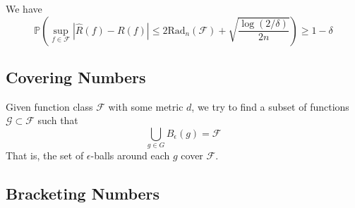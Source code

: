  \begin{theorem}
    \label{thm:uniform-deviation-bound-via-rademacher}
    We have 
    \begin{equation}
      \mathbb{P} \left( \sup_{f \in \mathcal{F}} |\hat{R} (f) - R(f)| \leq 2 \mathrm{Rad}_n (\mathcal{F}) + \sqrt{\frac{\log (2 / \delta)}{2 n}} \right) \geq 1 - \delta
    \end{equation}
  \end{theorem}

\subsection{Covering Numbers} 

  Given function class $\mathcal{F}$ with some metric $d$, we try to find a subset of functions $\mathcal{G} \subset \mathcal{F}$ such that 
  \begin{equation}
    \bigcup_{g \in G} B_\epsilon(g) = \mathcal{F}
  \end{equation}
  That is, the set of $\epsilon$-balls around each $g$ cover $\mathcal{F}$. 

\subsection{Bracketing Numbers} 

  
